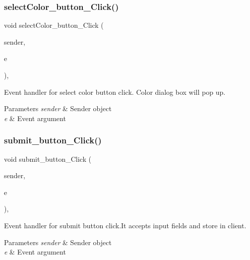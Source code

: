 \subsubsection{\texorpdfstring{select\+Color\+\_\+button\+\_\+\+Click()}{selectColor\_button\_Click()}}
{\footnotesize\ttfamily void select\+Color\+\_\+button\+\_\+\+Click (\begin{DoxyParamCaption}\item[{object}]{sender,  }\item[{Event\+Args}]{e }\end{DoxyParamCaption})\hspace{0.3cm}{\ttfamily [inline]}, {\ttfamily [private]}}



Event handler for select color button click. Color dialog box will pop up. 


\begin{DoxyParams}{Parameters}
{\em sender} & Sender object\\
\hline
{\em e} & Event argument\\
\hline
\end{DoxyParams}
\mbox{\label{classWildlifeTrackingApp_1_1AddCategory_a4a8fd9eeb145ce142cc04944541ff56a}} 
\subsubsection{\texorpdfstring{submit\+\_\+button\+\_\+\+Click()}{submit\_button\_Click()}}
{\footnotesize\ttfamily void submit\+\_\+button\+\_\+\+Click (\begin{DoxyParamCaption}\item[{object}]{sender,  }\item[{Event\+Args}]{e }\end{DoxyParamCaption})\hspace{0.3cm}{\ttfamily [inline]}, {\ttfamily [private]}}



Event handler for submit button click.\+It accepts input fields and store in client. 


\begin{DoxyParams}{Parameters}
{\em sender} & Sender object\\
\hline
{\em e} & Event argument\\
\hline
\end{DoxyParams}


